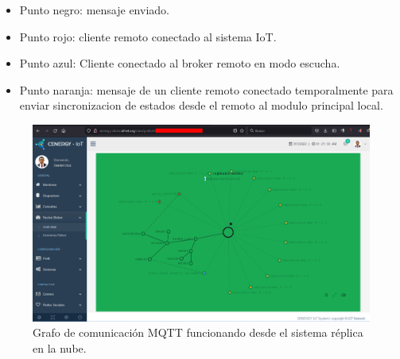 \begin{itemize}
\item Punto negro: mensaje enviado.
\item Punto rojo: cliente remoto conectado al sistema IoT.
\item Punto azul: Cliente conectado al broker remoto en modo escucha.
\item Punto naranja: mensaje de un cliente remoto conectado temporalmente para enviar sincronizacion de estados desde el remoto al modulo principal local. 
\end{itemize}

\begin{landscape} %
\begin{figure}[htpb]
\centering 
\includegraphics[width=1.6\textwidth]{./Figures/test/replicador/remoto.png}
\caption{Grafo de comunicación MQTT funcionando desde el sistema réplica en la nube.}
\label{fig:graforemoto}
\end{figure}
\end{landscape} 

